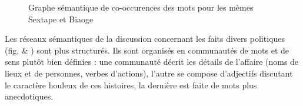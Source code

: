 \begin{figure}[ht]
    \centering
    
  \caption{
    Graphe s\'emantique de co-occurences des mots pour les m\`emes Sextape et Biaoge
  }
\end{figure}


Les r\'eseaux s\'emantiques de la discussion concernant les faits divers
politiques (fig. \label{fig:words-sextape} \& \label{fig:words-biaoge}) sont plus structur\'es. Ils sont organis\'es en
communaut\'es de mots et de sens plut\^ot bien d\'efinies : une
communaut\'e d\'ecrit les d\'etails de l{\textquoteright}affaire (noms
de lieux et de personnes, verbes d{\textquoteright}actions),
l{\textquoteright}autre se compose d{\textquoteright}adjectifs
discutant le caract\`ere houleux de ces histoires, la derni\`ere est
faite de mots plus anecdotiques. 

